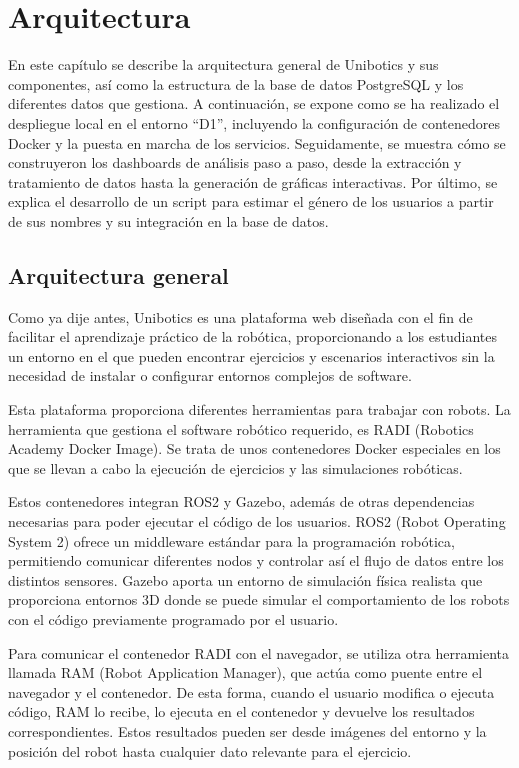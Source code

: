 \documentclass[a4paper, 12pt]{book}
\begin{document}
\chapter{Arquitectura}
\label{chap:diseño}


En este capítulo se describe la arquitectura general de Unibotics y sus componentes, así como la estructura de la base de datos PostgreSQL y los diferentes datos que gestiona. A continuación, se expone como se ha realizado el despliegue local en el entorno “D1”, incluyendo la configuración de contenedores Docker y la puesta en marcha de los servicios. Seguidamente, se muestra cómo se construyeron los dashboards de análisis paso a paso, desde la extracción y tratamiento de datos hasta la generación de gráficas interactivas. Por último, se explica el desarrollo de un script para estimar el género de los usuarios a partir de sus nombres y su integración en la base de datos.

\section{Arquitectura general} 
\label{sec:arquitectura}

Como ya dije antes, Unibotics es una plataforma web diseñada con el fin de facilitar el aprendizaje práctico de la robótica, proporcionando a los estudiantes un entorno en el que pueden encontrar ejercicios y escenarios interactivos sin la necesidad de instalar o configurar entornos complejos de software.

Esta plataforma proporciona diferentes herramientas para trabajar con robots. La herramienta que gestiona el software robótico requerido, es RADI (Robotics Academy Docker Image). Se trata de unos contenedores Docker especiales en los que se llevan a cabo la ejecución de ejercicios y las simulaciones robóticas.

Estos contenedores integran ROS2 y Gazebo, además de otras dependencias necesarias para poder ejecutar el código de los usuarios. ROS2 (Robot Operating System 2) ofrece un middleware estándar para la programación robótica, permitiendo comunicar diferentes nodos y controlar así el flujo de datos entre los distintos sensores. Gazebo aporta un entorno de simulación física realista que proporciona entornos 3D donde se puede simular el comportamiento de los robots con el código previamente programado por el usuario.

Para comunicar el contenedor RADI con el navegador, se utiliza otra herramienta llamada RAM (Robot Application Manager), que actúa como puente entre el navegador y el contenedor. De esta forma, cuando el usuario modifica o ejecuta código, RAM lo recibe, lo ejecuta en el contenedor y devuelve los resultados correspondientes. Estos resultados pueden ser desde imágenes del entorno y la posición del robot hasta cualquier dato relevante para el ejercicio.
\end{document}
